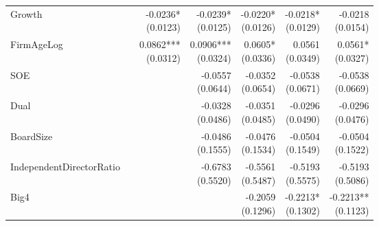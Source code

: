 \begin{table}[htbp]
{\begin{tabular}{lrrrrrr}
Growth &  & \shortstack{-0.0236* \\ (0.0123)} & \shortstack{-0.0239* \\ (0.0125)} & \shortstack{-0.0220* \\ (0.0126)} & \shortstack{-0.0218* \\ (0.0129)} & \shortstack{-0.0218 \\ (0.0154)}\\[8pt]
FirmAgeLog &  & \shortstack{0.0862*** \\ (0.0312)} & \shortstack{0.0906*** \\ (0.0324)} & \shortstack{0.0605* \\ (0.0336)} & \shortstack{0.0561 \\ (0.0349)} & \shortstack{0.0561* \\ (0.0327)}\\[8pt]
SOE &  &  & \shortstack{-0.0557 \\ (0.0644)} & \shortstack{-0.0352 \\ (0.0654)} & \shortstack{-0.0538 \\ (0.0671)} & \shortstack{-0.0538 \\ (0.0669)}\\[8pt]
Dual &  &  & \shortstack{-0.0328 \\ (0.0486)} & \shortstack{-0.0351 \\ (0.0485)} & \shortstack{-0.0296 \\ (0.0490)} & \shortstack{-0.0296 \\ (0.0476)}\\[8pt]
BoardSize &  &  & \shortstack{-0.0486 \\ (0.1555)} & \shortstack{-0.0476 \\ (0.1534)} & \shortstack{-0.0504 \\ (0.1549)} & \shortstack{-0.0504 \\ (0.1522)}\\[8pt]
IndependentDirectorRatio &  &  & \shortstack{-0.6783 \\ (0.5520)} & \shortstack{-0.5561 \\ (0.5487)} & \shortstack{-0.5193 \\ (0.5575)} & \shortstack{-0.5193 \\ (0.5086)}\\[8pt]
Big4 &  &  &  & \shortstack{-0.2059 \\ (0.1296)} & \shortstack{-0.2213* \\ (0.1302)} & \shortstack{-0.2213** \\ (0.1123)}\\[8pt]

\end{tabular}}
\end{table}
